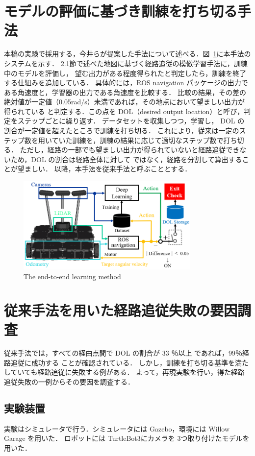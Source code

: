 \documentclass{jarticle}
\renewcommand{\figurename}{図~}
\newcommand{\figref}[1]{\figurename\ref{#1}}
\begin{document}
\section{モデルの評価に基づき訓練を打ち切る手法}
本稿の実験で採用する，今井らが提案した手法について述べる．\figref{fig:5}に本手法のシステムを示す．
2.1節で述べた地図に基づく経路追従の模倣学習手法に，訓練中のモデルを評価し，
望む出力がある程度得られたと判定したら，訓練を終了する仕組みを追加している．
具体的には，ROS navigation パッケージの出力である角速度と，学習器の出力である角速度を比較する．
比較の結果，その差の絶対値が一定値（0.05rad/s）未満であれば，その地点において望ましい出力が得られている
と判定する．この点を DOL（desired output location）と呼び，判定をステップごとに繰り返す．
データセットを収集しつつ，学習し， DOL の割合が一定値を超えたところで訓練を打ち切る．
これにより，従来は一定のステップ数を用いていた訓練を，訓練の結果に応じて適切なステップ数で打ち切る．
ただし，経路の一部でも望ましい出力が得られていないと経路追従できないため，DOL の割合は経路全体に対して
ではなく，経路を分割して算出することが望ましい．
以降，本手法を従来手法と呼ぶこととする．




\begin{figure}[h!]
  \centering
   \includegraphics[height=48mm]{./png/moderu.png}
   \caption{The end-to-end learning method}
   \label{fig:5}
\end{figure}


\section{従来手法を用いた経路追従失敗の要因調査}
従来手法では，すべての経由点間で DOL の割合が 33 ％以上 であれば，99％経路追従に成功する
ことが確認されている\cite{imai2}．
しかし，訓練を打ち切る基準を満たしていても経路追従に失敗する例がある．
よって，再現実験を行い，得た経路追従失敗の一例からその要因を調査する．

\subsection{実験装置}
実験はシミュレータで行う．シミュレータには Gazebo\cite{gazebo}，環境には Willow Garage を用いた．
ロボットには TurtleBot3\cite{TurtleBot3}にカメラを 3つ取り付けたモデルを用いた．
\end{document}

